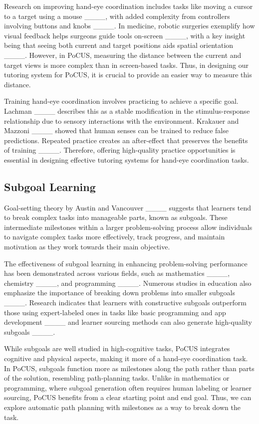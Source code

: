 Research on improving hand-eye coordination includes tasks like moving a cursor to a target using a mouse ____, with added complexity from controllers involving buttons and knobs ____. In medicine, robotic surgeries exemplify how visual feedback helps surgeons guide tools on-screen ____, with a key insight being that seeing both current and target positions aids spatial orientation ____. However, in PoCUS, measuring the distance between the current and target views is more complex than in screen-based tasks. Thus, in designing our tutoring system for PoCUS, it is crucial to provide an easier way to measure this distance.

Training hand-eye coordination involves practicing to achieve a specific goal. Lachman ____ describes this as a stable modification in the stimulus-response relationship due to sensory interactions with the environment. Krakauer and Mazzoni ____ showed that human senses can be trained to reduce false predictions. Repeated practice creates an after-effect that preserves the benefits of training ____. Therefore, offering high-quality practice opportunities is essential in designing effective tutoring systems for hand-eye coordination tasks.

\subsection{Subgoal Learning}
Goal-setting theory by Austin and Vancouver ____ suggests that learners tend to break complex tasks into manageable parts, known as subgoals. These intermediate milestones within a larger problem-solving process allow individuals to navigate complex tasks more effectively, track progress, and maintain motivation as they work towards their main objective. 

The effectiveness of subgoal learning in enhancing problem-solving performance has been demonstrated across various fields, such as mathematics ____, chemistry ____, and programming ____. Numerous studies in education also emphasize the importance of breaking down problems into smaller subgoals ____. Research indicates that learners with constructive subgoals outperform those using expert-labeled ones in tasks like basic programming and app development ____ and learner sourcing methods can also generate high-quality subgoals ____.

While subgoals are well studied in high-cognitive tasks, PoCUS integrates cognitive and physical aspects, making it more of a hand-eye coordination task. In PoCUS, subgoals function more as milestones along the path rather than parts of the solution, resembling path-planning tasks. Unlike in mathematics or programming, where subgoal generation often requires human labeling or learner sourcing, PoCUS benefits from a clear starting point and end goal. Thus, we can explore automatic path planning with milestones as a way to break down the task.

